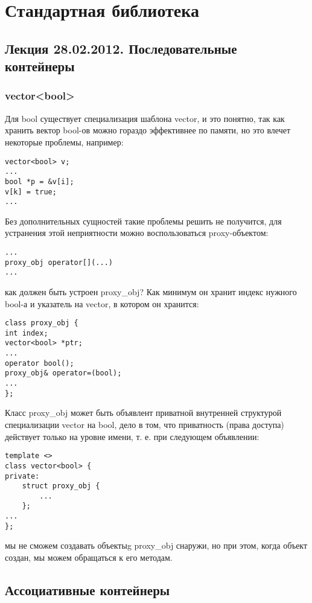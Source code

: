 \chapter{Стандартная библиотека}

\section{Лекция 28.02.2012. Последовательные контейнеры}

\subsection{vector<bool>}

Для bool существует специализация шаблона vector, и это понятно, так как хранить вектор bool-ов можно гораздо эффективнее по памяти, но это влечет некоторые
проблемы, например:

\begin{lstlisting}
vector<bool> v;
...
bool *p = &v[i];
v[k] = true;
...
\end{lstlisting}

Без дополнительных сущностей такие проблемы решить не получится, для устранения этой неприятности можно воспользоваться proxy-объектом:
\begin{lstlisting}
...
proxy_obj operator[](...)
...
\end{lstlisting}

как должен быть устроен proxy\_obj? Как минимум он хранит индекс нужного bool-а и указатель на vector, в котором он хранится:
\begin{lstlisting}
class proxy_obj {
int index;
vector<bool> *ptr;
...
operator bool();
proxy_obj& operator=(bool);
...
};
\end{lstlisting}

Класс proxy\_obj может быть объявлент приватной внутренней структурой специализации vector на bool, дело в том, что приватность (права доступа) действует только
на уровне имени, т. е. при следующем объявлении:
\begin{lstlisting}
template <>
class vector<bool> {
private:
	struct proxy_obj {
		...
	};
...
};
\end{lstlisting}
мы не сможем создавать объектыg proxy\_obj снаружи, но при этом, когда объект создан, мы можем обращаться к его методам.

\section{Ассоциативные контейнеры}

